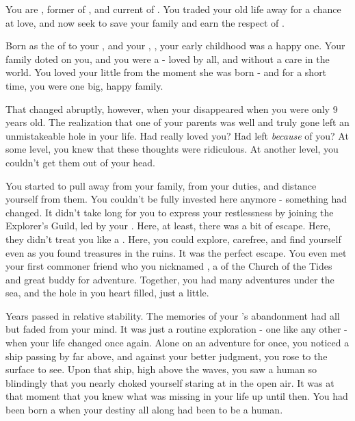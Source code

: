 \documentclass[char]{NeptuneBall}
\begin{document}
\name{\cAriel{}}





You are \cAriel{}, former \cAriel{\Prince} of \pAtlantis{}, and current \cAriel{\King} of \pAmerica{}. You traded your old life away for a chance at love, and now seek to save your family and earn the respect of \pAmerica{}.

Born as the \cAriel{\mer} \cAriel{\prince} of \pAtlantis{} to your \cKing{\parent}, \cKing{\King} \cKing{} and your \cQueen{\parent}, \cQueen{\King} \cQueen{}, your early childhood was a happy one. Your family doted on you, and you were a \cAriel{\prince} - loved by all, and without a care in the world. You loved your little \cPrincess{\sibling} \cPrincess{} from the moment she was born - and for a short time, you were one big, happy family.

That changed abruptly, however, when your \cQueen{\parent} disappeared when you were only 9 years old. The realization that one of your parents was well and truly gone left an unmistakeable hole in your life. Had \cQueen{\they} really loved you? Had \cQueen{\they} left \emph{because} of you? At some level, you knew that these thoughts were ridiculous. At another level, you couldn't get them out of your head.

You started to pull away from your family, from your duties, and distance yourself from them. You couldn't be fully invested here anymore - something had changed. It didn't take long for you to express your restlessness by joining the Explorer's Guild, led by your \cPlant{\Uncle} \cPlant{}. Here, at least, there was a bit of escape. Here, they didn't treat you like a \cAriel{\prince}. Here, you could explore, carefree, and find yourself even as you found treasures in the ruins. It was the perfect escape. You even met your first commoner friend who you nicknamed \cPriest{}, a \cPriest{\priest} of the Church of the Tides and great buddy for adventure. Together, you had many adventures under the sea, and the hole in you heart filled, just a little.

Years passed in relative stability. The memories of your \cQueen{\parent}'s abandonment had all but faded from your mind. It was just a routine exploration - one like any other - when your life changed once again. Alone on an adventure for once, you noticed a ship passing by far above, and against your better judgment, you rose to the surface to see. Upon that ship, high above the waves, you saw a human so blindingly \cEric{\hot} that you nearly choked yourself staring at \cEric{\them} in the open air. It was at that moment that you knew what was missing in your life up until then. You had been born a \cAriel{\mer} when your destiny all along had been to be a human.
\end{document}

